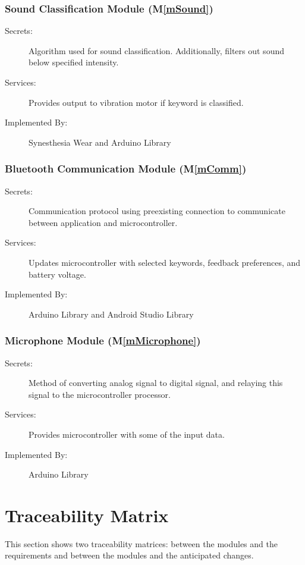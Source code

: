 \documentclass[12pt, titlepage]{article}
\newcommand{\mref}[1]{M\ref{#1}}
\begin{document}
\subsubsection{Sound Classification Module (\mref{mSound})}
\begin{description}
  \item[Secrets:] Algorithm used for sound classification. Additionally, filters out sound below specified intensity.
  \item[Services:] Provides output to vibration motor if keyword is classified.
  \item[Implemented By:] Synesthesia Wear and Arduino Library
  \end{description}

\subsubsection{Bluetooth Communication Module (\mref{mComm})}
\begin{description}
  \item[Secrets:] Communication protocol using preexisting connection to communicate between application and microcontroller.
  \item[Services:] Updates microcontroller with selected keywords, feedback preferences, and battery voltage.
  \item[Implemented By:] Arduino Library and Android Studio Library
  \end{description}

\subsubsection{Microphone Module (\mref{mMicrophone})}
\begin{description}
  \item[Secrets:] Method of converting analog signal to digital signal, and relaying this signal to the microcontroller processor.
  \item[Services:] Provides microcontroller with some of the input data.
  \item[Implemented By:] Arduino Library
  \end{description}

\section{Traceability Matrix} \label{SecTM}

This section shows two traceability matrices: between the modules and the
requirements and between the modules and the anticipated changes.
\end{document}
